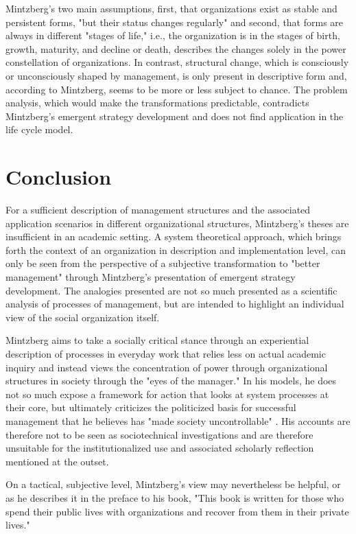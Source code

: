 \documentclass[a4paper,12pt]{article}
\begin{document}
Mintzberg's two main assumptions, first, that organizations exist as stable
and persistent forms, "but their status changes regularly"
\cite[p. 287]{Mintzberg} and second, that forms are always in different
"stages of life," i.e., the organization is in the stages of birth, growth,
maturity, and decline or death, describes the changes solely in the power
constellation of organizations. In contrast, structural change, which is
consciously or unconsciously shaped by management, is only present in
descriptive form and, according to Mintzberg, seems to be more or less subject
to chance. The problem analysis, which would make the transformations
predictable, contradicts Mintzberg's emergent strategy development and does
not find application in the life cycle model.

\section{Conclusion}

For a sufficient description of management structures and the associated
application scenarios in different organizational structures, Mintzberg's
theses are insufficient in an academic setting. A system theoretical approach,
which brings forth the context of an organization in description and
implementation level, can only be seen from the perspective of a subjective
transformation to "better management" through Mintzberg's presentation of
emergent strategy development. The analogies presented are not so much
presented as a scientific analysis of processes of management, but are
intended to highlight an individual view of the social organization itself.

Mintzberg aims to take a socially critical stance through an experiential
description of processes in everyday work that relies less on actual academic
inquiry and instead views the concentration of power through organizational
structures in society through the "eyes of the manager." In his models, he
does not so much expose a framework for action that looks at system processes
at their core, but ultimately criticizes the politicized basis for successful
management that he believes has "made society uncontrollable"
\cite[p. 331]{Mintzberg}. His accounts are therefore not to be seen as
sociotechnical investigations and are therefore unsuitable for the
institutionalized use and associated scholarly reflection mentioned at the
outset.

On a tactical, subjective level, Mintzberg's view may nevertheless be helpful,
or as he describes it in the preface to his book, "This book is written for
those who spend their public lives with organizations and recover from them in
their private lives."
\end{document}
